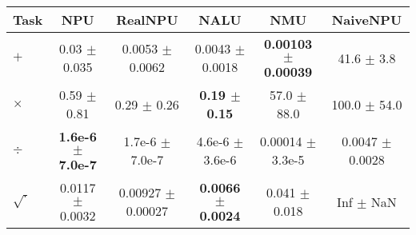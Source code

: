 \begin{tabular}{lccccc}
\toprule
Task & NPU & RealNPU & NALU & NMU & NaiveNPU\\
\midrule
$+$  & 0.03 $\pm$ 0.035 & 0.0053 $\pm$ 0.0062 &0.0043 $\pm$ 0.0018 & \textbf{0.00103 $\pm$ 0.00039} & 41.6 $\pm$ 3.8 \\
$\times$ & 0.59 $\pm$ 0.81 & 0.29 $\pm$ 0.26 &\textbf{0.19 $\pm$ 0.15} & 57.0 $\pm$ 88.0 & 100.0 $\pm$ 54.0 \\
$\div$  & \textbf{1.6e-6 $\pm$ 7.0e-7} & 1.7e-6 $\pm$ 7.0e-7 &4.6e-6 $\pm$ 3.6e-6 & 0.00014 $\pm$ 3.3e-5 & 0.0047 $\pm$ 0.0028 \\
$\sqrt{\cdot}$ & 0.0117 $\pm$ 0.0032 & 0.00927 $\pm$ 0.00027 &\textbf{0.0066 $\pm$ 0.0024} & 0.041 $\pm$ 0.018 & Inf $\pm$ NaN \\
\bottomrule
\end{tabular}
